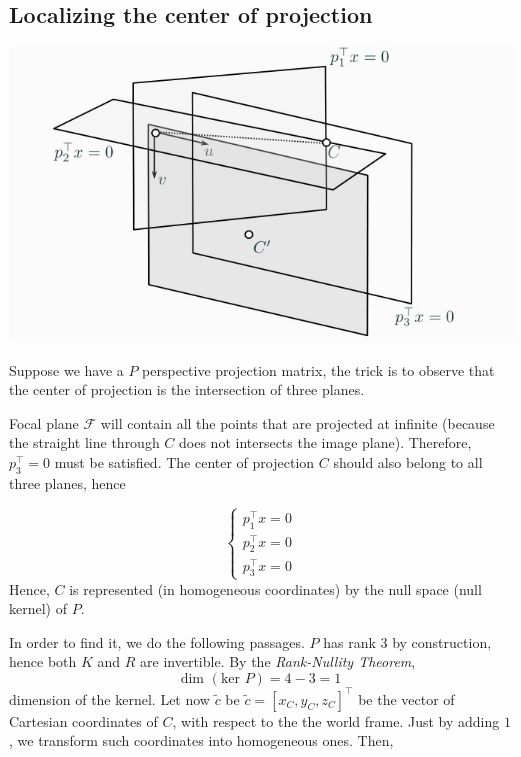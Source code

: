 \documentclass[10pt]{report}
\begin{document}
\subsection{Localizing the center of projection}
\label{sec:org980076d}

\begin{center}
\includegraphics[scale=0.35]{./pics/cal/center-of-projection.jpg}
\end{center}

Suppose we have a \(P\) perspective projection matrix, the trick is to
observe that the center of projection is the intersection of three
planes.

Focal plane \(\mathcal{F}\) will contain all the points that are
projected at infinite (because the straight line through \(C\) does not
intersects the image plane). Therefore, \(p_3^\top = 0\) must be
satisfied. The center of projection \(C\) should also belong to all
three planes, hence

\[\left\{\begin{array}{l} p_1^\top x = 0\\ p_2^\top x = 0 \\ p_3^\top x = 0 \end{array}\right.\]
Hence, \(C\) is represented (in homogeneous coordinates) by the null
space (null kernel) of \(P\).

In order to find it, we do the following passages. \(P\) has rank \(3\)
by construction, hence both \(K\) and \(R\) are invertible. By the
\emph{Rank-Nullity Theorem}, \[\mbox{dim }( \mbox{ker } P ) = 4 - 3 = 1\]
dimension of the kernel. Let now \(\tilde{c}\) be
\(\tilde c = [x_C, y_C, z_C]^\top\) be the vector of Cartesian coordinates of \(C\), with respect to the the world frame. Just by adding \(1\), we transform
such coordinates into homogeneous ones. Then,
\end{document}
